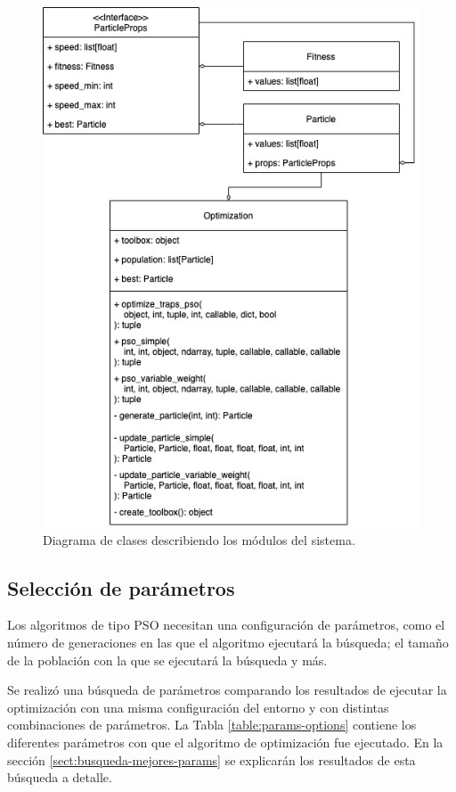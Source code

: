 \documentclass[letterpaper]{report}
\begin{document}
    \begin{figure}[ht!]
      \includegraphics[width=\textwidth]{optimization-modules.jpeg}
      \caption{Diagrama de clases describiendo los módulos del sistema.}
      \label{fig:optimization-modules}
    \end{figure}

    \subsection{Selección de parámetros}

    Los algoritmos de tipo PSO necesitan una configuración de parámetros, como
    el número de generaciones en las que el algoritmo ejecutará la búsqueda;
    el tamaño de la población con la que se ejecutará la búsqueda y más.

    Se realizó una búsqueda de parámetros comparando los resultados de ejecutar
    la optimización con una misma configuración del entorno y con distintas
    combinaciones de parámetros. La Tabla \ref{table:params-options} contiene
    los diferentes parámetros con que el algoritmo de optimización fue
    ejecutado. En la sección \ref{sect:busqueda-mejores-params} se explicarán
    los resultados de esta búsqueda a detalle.
\end{document}
